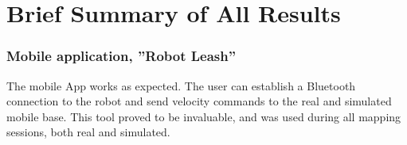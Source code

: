 \section{Brief Summary of All Results}
\label{sec:results_summary}

\subsubsection{Mobile application, ''Robot Leash''}

The mobile App works as expected. The user can establish a Bluetooth connection to the robot and send velocity commands to the real and simulated mobile base. This tool proved to be invaluable, and was used during all mapping sessions, both real and simulated.

